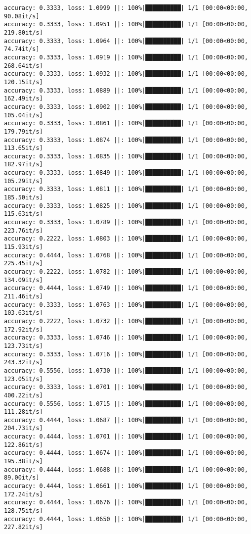 \documentclass[
]{article}
\begin{document}
\begin{verbatim}
accuracy: 0.3333, loss: 1.0999 ||: 100%|██████████| 1/1 [00:00<00:00, 90.08it/s]
accuracy: 0.3333, loss: 1.0951 ||: 100%|██████████| 1/1 [00:00<00:00, 219.80it/s]
accuracy: 0.3333, loss: 1.0964 ||: 100%|██████████| 1/1 [00:00<00:00, 74.74it/s]
accuracy: 0.3333, loss: 1.0919 ||: 100%|██████████| 1/1 [00:00<00:00, 268.64it/s]
accuracy: 0.3333, loss: 1.0932 ||: 100%|██████████| 1/1 [00:00<00:00, 120.15it/s]
accuracy: 0.3333, loss: 1.0889 ||: 100%|██████████| 1/1 [00:00<00:00, 162.49it/s]
accuracy: 0.3333, loss: 1.0902 ||: 100%|██████████| 1/1 [00:00<00:00, 105.04it/s]
accuracy: 0.3333, loss: 1.0861 ||: 100%|██████████| 1/1 [00:00<00:00, 179.79it/s]
accuracy: 0.3333, loss: 1.0874 ||: 100%|██████████| 1/1 [00:00<00:00, 113.65it/s]
accuracy: 0.3333, loss: 1.0835 ||: 100%|██████████| 1/1 [00:00<00:00, 182.97it/s]
accuracy: 0.3333, loss: 1.0849 ||: 100%|██████████| 1/1 [00:00<00:00, 105.29it/s]
accuracy: 0.3333, loss: 1.0811 ||: 100%|██████████| 1/1 [00:00<00:00, 185.50it/s]
accuracy: 0.3333, loss: 1.0825 ||: 100%|██████████| 1/1 [00:00<00:00, 115.63it/s]
accuracy: 0.3333, loss: 1.0789 ||: 100%|██████████| 1/1 [00:00<00:00, 223.76it/s]
accuracy: 0.2222, loss: 1.0803 ||: 100%|██████████| 1/1 [00:00<00:00, 115.93it/s]
accuracy: 0.4444, loss: 1.0768 ||: 100%|██████████| 1/1 [00:00<00:00, 225.45it/s]
accuracy: 0.2222, loss: 1.0782 ||: 100%|██████████| 1/1 [00:00<00:00, 134.09it/s]
accuracy: 0.4444, loss: 1.0749 ||: 100%|██████████| 1/1 [00:00<00:00, 211.46it/s]
accuracy: 0.3333, loss: 1.0763 ||: 100%|██████████| 1/1 [00:00<00:00, 103.63it/s]
accuracy: 0.2222, loss: 1.0732 ||: 100%|██████████| 1/1 [00:00<00:00, 172.92it/s]
accuracy: 0.3333, loss: 1.0746 ||: 100%|██████████| 1/1 [00:00<00:00, 123.73it/s]
accuracy: 0.3333, loss: 1.0716 ||: 100%|██████████| 1/1 [00:00<00:00, 243.32it/s]
accuracy: 0.5556, loss: 1.0730 ||: 100%|██████████| 1/1 [00:00<00:00, 123.05it/s]
accuracy: 0.3333, loss: 1.0701 ||: 100%|██████████| 1/1 [00:00<00:00, 400.22it/s]
accuracy: 0.5556, loss: 1.0715 ||: 100%|██████████| 1/1 [00:00<00:00, 111.28it/s]
accuracy: 0.4444, loss: 1.0687 ||: 100%|██████████| 1/1 [00:00<00:00, 204.73it/s]
accuracy: 0.4444, loss: 1.0701 ||: 100%|██████████| 1/1 [00:00<00:00, 122.86it/s]
accuracy: 0.4444, loss: 1.0674 ||: 100%|██████████| 1/1 [00:00<00:00, 195.38it/s]
accuracy: 0.4444, loss: 1.0688 ||: 100%|██████████| 1/1 [00:00<00:00, 89.00it/s]
accuracy: 0.4444, loss: 1.0661 ||: 100%|██████████| 1/1 [00:00<00:00, 172.24it/s]
accuracy: 0.4444, loss: 1.0676 ||: 100%|██████████| 1/1 [00:00<00:00, 128.75it/s]
accuracy: 0.4444, loss: 1.0650 ||: 100%|██████████| 1/1 [00:00<00:00, 227.82it/s]

\end{verbatim}
\end{document}
